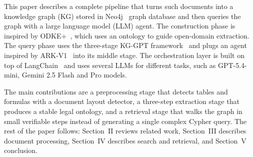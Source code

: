 \documentclass[conference]{IEEEtran}
\begin{document}
This paper describes a complete pipeline that turns such documents into a knowledge graph (KG) stored in Neo4j~\cite{neo4j} graph database and then queries the graph with a large language model (LLM) agent. The construction phase is inspired by ODKE+~\cite{odkeplus2025}, which uses an ontology to guide open-domain extraction. The query phase uses the three-stage {KG-GPT framework}~\cite{kggpt2023} and plugs an agent inspired by {ARK-V1}~\cite{arkv12025} into its middle stage. The orchestration layer is built on top of LangChain~\cite{langchain} and uses several LLMs for different tasks, such as GPT-5.4-mini, Gemini 2.5 Flash and Pro models.

The main contributions are a preprocessing stage that detects tables and formulas with a document layout detector, a three-step extraction stage that produces a stable legal ontology, and a retrieval stage that walks the graph in small verifiable steps instead of generating a single complex Cypher query. The rest of the paper follows: Section~II reviews related work, Section~III describes document processing, Section~IV describes search and retrieval, and Section~V conclusion.
\end{document}
